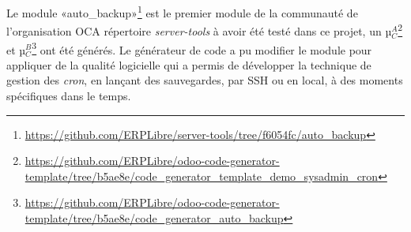 Le module «auto\_backup»\footnote{\url{https://github.com/ERPLibre/server-tools/tree/f6054fc/auto_backup}} est le premier module de la communauté de l'organisation OCA répertoire \textit{server-tools} à avoir été testé dans ce projet, un µ$_C^A$\footnote{\url{https://github.com/ERPLibre/odoo-code-generator-template/tree/b5ae8e/code_generator_template_demo_sysadmin_cron}} et µ$_C^B$\footnote{\url{https://github.com/ERPLibre/odoo-code-generator-template/tree/b5ae8e/code_generator_auto_backup}} ont été générés. Le générateur de code a pu modifier le module pour appliquer de la qualité logicielle qui a permis de développer la technique de gestion des \textit{cron}, en lançant des sauvegardes, par SSH ou en local, à des moments spécifiques dans le temps.








